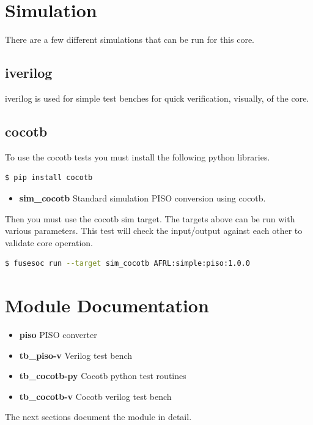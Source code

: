 \newpage

\section{Simulation}
\par
There are a few different simulations that can be run for this core.

\subsection{iverilog}
\par
iverilog is used for simple test benches for quick verification, visually, of the core.

\subsection{cocotb}
\par
To use the cocotb tests you must install the following python libraries.
\begin{lstlisting}[language=bash]
  $ pip install cocotb
\end{lstlisting}

\begin{itemize}
  \item \textbf{sim\_cocotb} Standard simulation PISO conversion using cocotb.
\end{itemize}

Then you must use the cocotb sim target. The targets above can be run with various parameters.
This test will check the input/output against each other to validate core operation.
\begin{lstlisting}[language=bash]
  $ fusesoc run --target sim_cocotb AFRL:simple:piso:1.0.0
\end{lstlisting}

\newpage

\section{Module Documentation} \label{Module Documentation}

\par

\begin{itemize}
\item \textbf{piso} PISO converter\\
\item \textbf{tb\_piso-v} Verilog test bench\\
\item \textbf{tb\_cocotb-py} Cocotb python test routines\\
\item \textbf{tb\_cocotb-v} Cocotb verilog test bench\\
\end{itemize}
The next sections document the module in detail.

